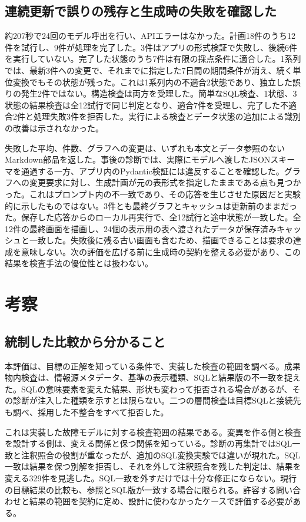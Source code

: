 \documentclass[manuscript,review,anonymous]{acmart}
\begin{document}
\subsection{連続更新で誤りの残存と生成時の失敗を確認した}

約207秒で24回のモデル呼出を行い、APIエラーはなかった。計画18件のうち12件を試行し、9件が処理を完了した。3件はアプリの形式検証で失敗し、後続6件を実行していない。完了した状態のうち7件は有限の採点条件に適合した。1系列では、最新3件への変更で、それまでに指定した7日間の期間条件が消え、続く単位変換でもその状態が残った。これは1系列内の不適合2状態であり、独立した誤りの発生2件ではない。構造検査は両方を受理した。簡単なSQL検査、1状態、3状態の結果検査は全12試行で同じ判定となり、適合7件を受理し、完了した不適合2件と処理失敗3件を拒否した。実行による検査とデータ状態の追加による識別の改善は示されなかった。

失敗した平均、件数、グラフへの変更は、いずれも本文とデータ参照のないMarkdown部品を返した。事後の診断では、実際にモデルへ渡したJSONスキーマを通過する一方、アプリ内のPydantic検証には違反することを確認した。グラフへの変更要求に対し、生成計画が元の表形式を指定したままである点も見つかった。これはプロンプト内の不一致であり、その応答を生じさせた原因だと実験的に示したものではない。3件とも最終グラフとキャッシュは更新前のままだった。保存した応答からのローカル再実行で、全12試行と途中状態が一致した。全12件の最終画面を描画し、24個の表示用の表へ渡されたデータが保存済みキャッシュと一致した。失敗後に残る古い画面も含むため、描画できることは要求の達成を意味しない。次の評価を広げる前に生成時の契約を整える必要があり、この結果を検査手法の優位性とは扱わない。

\section{考察}

\subsection{統制した比較から分かること}

本評価は、目標の正解を知っている条件で、実装した検査の範囲を調べる。成果物内検査は、情報源メタデータ、基準の表示種類、SQLと結果版の不一致を捉えた。SQLの意味要素を変えた結果、形状も変わって拒否される場合があるが、その診断が注入した種類を示すとは限らない。二つの層間検査は目標SQLと接続先も調べ、採用した不整合をすべて拒否した。

これは実装した故障モデルに対する検査範囲の結果である。変異を作る側と検査を設計する側は、変える関係と保つ関係を知っている。診断の再集計ではSQL一致と注釈照合の役割が重なったが、追加のSQL変換実験では違いが現れた。SQL一致は結果を保つ別解を拒否し、それを外して注釈照合を残した判定は、結果を変える329件を見逃した。SQL一致を外すだけでは十分な修正にならない。現行の目標結果の比較も、参照とSQL版が一致する場合に限られる。許容する問い合わせと結果の範囲を契約に定め、設計に使わなかったケースで評価する必要がある。
\end{document}
